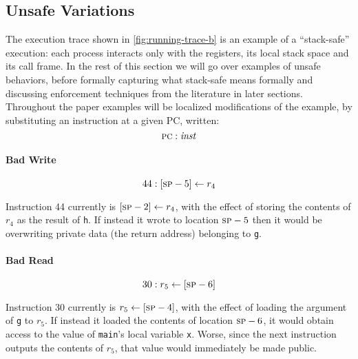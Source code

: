 \documentclass[acmsmall,review,anonymous]{acmart}\settopmatter{printfolios=true,printccs=false,printacmref=false}
\begin{document}
\subsection{Unsafe Variations}

The execution trace shown in \cref{fig:running-trace-b} is an example
of a ``stack-safe'' execution: each process interacts only with the
registers, its local stack space and its call frame. In the rest of
this section we will go over examples of unsafe behaviors, before
formally capturing what stack-safe means formally and discussing
enforcement techniques from the literature in later sections. Throughout
the paper examples will be localized modifications of the example, by
substituting an instruction at a given PC, written:
\[\textsc{pc} :\mathit{inst}\]


\paragraph*{Bad Write}

\[
44 : [\textsc{sp} - 5] \leftarrow r_4
\]

Instruction 44 currently is
$ [\textsc{sp} - 2] \leftarrow r_4$,
with the
effect of storing the contents of $r_4$ as the result of {\tt h}. If
instead it wrote to location $\textsc{sp} - 5$ then it would be overwriting
private data (the return address) belonging to {\tt g}.

\paragraph*{Bad Read}

\[
30 : r_5  \leftarrow [\textsc{sp} - 6]
\]

Instruction 30 currently is
$ r_5 \leftarrow [\textsc{sp} - 4]$,
with the
effect of loading the argument of {\tt g} to $r_5$. If instead it
loaded the contents of location $\textsc{sp} - 6$, it would obtain access
to the value of {\tt main}'s local variable {\tt x}. Worse, since the next instruction
outputs the contents of $r_5$, that value would immediately be made public.
\end{document}
